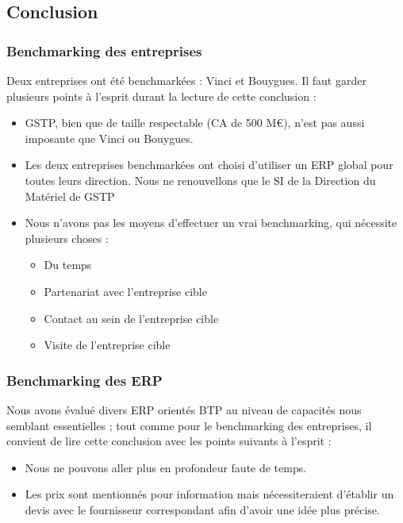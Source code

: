 \subsection{Conclusion}

\subsubsection{Benchmarking des entreprises}

Deux entreprises ont été benchmarkées : Vinci et Bouygues. Il faut garder
plusieurs points à l'esprit durant la lecture de cette conclusion :

\begin{itemize}
\item GSTP, bien que de taille respectable (CA de 500 M\euro), n'est pas aussi
imposante que Vinci ou Bouygues.
\item Les deux entreprises benchmarkées ont choisi d'utiliser un ERP
global pour toutes leurs direction. Nous ne renouvellons que le SI de la
Direction du Matériel de GSTP
\item Nous n'avons pas les moyens d'effectuer un vrai benchmarking, qui
nécessite plusieurs choses :
    \begin{itemize}
    \item Du temps
    \item Partenariat avec l'entreprise cible
    \item Contact au sein de l'entreprise cible
    \item Visite de l'entreprise cible
    \end{itemize}
\end{itemize}


\subsubsection{Benchmarking des ERP}

Nous avons évalué divers ERP orientés BTP au niveau de capacités nous
semblant essentielles ; tout comme pour le benchmarking des entreprises, il
convient de lire cette conclusion avec les points suivants à l'esprit :

\begin{itemize}
\item Nous ne pouvons aller plus en profondeur faute de temps.
\item Les prix sont mentionnés pour information mais nécessiteraient
d'établir un devis avec le fournisseur correspondant afin d'avoir une idée
plus précise.
\end{itemize}


